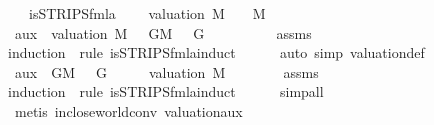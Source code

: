 \begin{isabellebody}
\ \ \ {\isachardoublequoteopen}is{\isacharunderscore}{\kern0pt}STRIPS{\isacharunderscore}{\kern0pt}fmla\ {\isasymphi}{\isachardoublequoteclose}\isanewline
\ \ \ {\isachardoublequoteopen}valuation\ M\ {\isasymTurnstile}\ {\isasymphi}\ {\isasymlongleftrightarrow}\ M\ {\isasymTTurnstile}\ {\isasymphi}{\isachardoublequoteclose}\isanewline
%
\isadelimproof
%
\endisadelimproof
%
\isatagproof
{}\isamarkupfalse%
\ {\isacharminus}{\kern0pt}\isanewline
\ \ \isamarkupfalse%
\ aux{}{\isacharcolon}{\kern0pt}\ {\isachardoublequoteopen}{\isasymAnd}{\isasymA}{\isachardot}{\kern0pt}\ {\isasymlbrakk}valuation\ M\ {\isasymTurnstile}\ {\isasymphi}{\isacharsemicolon}{\kern0pt}\ {\isasymforall}G{\isasymin}M{\isachardot}{\kern0pt}\ {\isasymA}\ {\isasymTurnstile}\ G{\isasymrbrakk}\ {\isasymLongrightarrow}\ {\isasymA}\ {\isasymTurnstile}\ {\isasymphi}{\isachardoublequoteclose}\isanewline
\ \ \ \ \isamarkupfalse%
\ assms\ \isamarkupfalse%
{\isacharparenleft}{\kern0pt}induction\ {\isasymphi}\ rule{\isacharcolon}{\kern0pt}\ is{\isacharunderscore}{\kern0pt}STRIPS{\isacharunderscore}{\kern0pt}fmla{\isachardot}{\kern0pt}induct{\isacharparenright}{\kern0pt}\isanewline
\ \ \ \ \isamarkupfalse%
\ {\isacharparenleft}{\kern0pt}auto\ simp{\isacharcolon}{\kern0pt}\ valuation{\isacharunderscore}{\kern0pt}def{\isacharparenright}{\kern0pt}\isanewline
\ \ \isamarkupfalse%
\ aux{}{\isacharcolon}{\kern0pt}\ {\isachardoublequoteopen}{\isasymlbrakk}{\isasymforall}{\isasymA}{\isachardot}{\kern0pt}\ {\isacharparenleft}{\kern0pt}{\isasymforall}G{\isasymin}M{\isachardot}{\kern0pt}\ {\isasymA}\ {\isasymTurnstile}\ G{\isacharparenright}{\kern0pt}\ {\isasymlongrightarrow}\ {\isasymA}\ {\isasymTurnstile}\ {\isasymphi}{\isasymrbrakk}\ {\isasymLongrightarrow}\ valuation\ M\ {\isasymTurnstile}\ {\isasymphi}{\isachardoublequoteclose}\isanewline
\ \ \ \ \isamarkupfalse%
\ assms\isanewline
\ \ \ \ \isamarkupfalse%
{\isacharparenleft}{\kern0pt}induction\ {\isasymphi}\ rule{\isacharcolon}{\kern0pt}\ is{\isacharunderscore}{\kern0pt}STRIPS{\isacharunderscore}{\kern0pt}fmla{\isachardot}{\kern0pt}induct{\isacharparenright}{\kern0pt}\isanewline
\ \ \ \ \isamarkupfalse%
\ simp{\isacharunderscore}{\kern0pt}all\isanewline
\ \ \ \ \isamarkupfalse%
\ {\isacharparenleft}{\kern0pt}metis\ in{\isacharunderscore}{\kern0pt}close{\isacharunderscore}{\kern0pt}world{\isacharunderscore}{\kern0pt}conv\ valuation{\isacharunderscore}{\kern0pt}aux{\isacharunderscore}{\kern0pt}{}{\isacharparenright}{\kern0pt}\isanewline

\end{isabellebody}
